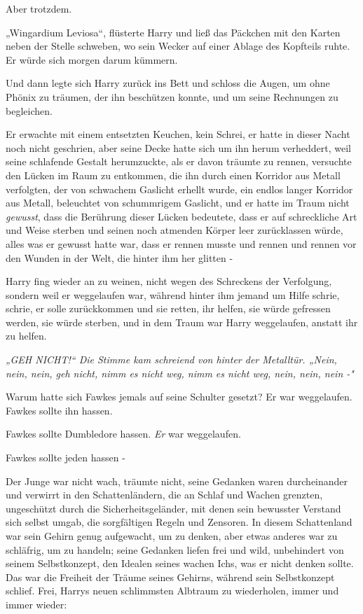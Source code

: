 {Aber trotzdem.

„Wingardium Leviosa“, flüsterte Harry und ließ das Päckchen mit den Karten neben der Stelle schweben, wo sein Wecker auf einer Ablage des Kopfteils ruhte. Er würde sich morgen darum kümmern.

Und dann legte sich Harry zurück ins Bett und schloss die Augen, um ohne Phönix zu träumen, der ihn beschützen konnte, und um seine Rechnungen zu begleichen.

Er erwachte mit einem entsetzten Keuchen, kein Schrei, er hatte in dieser Nacht noch nicht geschrien, aber seine Decke hatte sich um ihn herum verheddert, weil seine schlafende Gestalt herumzuckte, als er davon träumte zu rennen, versuchte den Lücken im Raum zu entkommen, die ihn durch einen Korridor aus Metall verfolgten, der von schwachem Gaslicht erhellt wurde, ein endlos langer Korridor aus Metall, beleuchtet von schummrigem Gaslicht, und er hatte im Traum nicht \emph{gewusst}, dass die Berührung dieser Lücken bedeutete, dass er auf schreckliche Art und Weise sterben und seinen noch atmenden Körper leer zurücklassen würde, alles was er gewusst hatte war, dass er rennen musste und rennen und rennen vor den Wunden in der Welt, die hinter ihm her glitten -

Harry fing wieder an zu weinen, nicht wegen des Schreckens der Verfolgung, sondern weil er weggelaufen war, während hinter ihm jemand um Hilfe schrie, schrie, er solle zurückkommen und sie retten, ihr helfen, sie würde gefressen werden, sie würde sterben, und in dem Traum war Harry weggelaufen, anstatt ihr zu helfen.

\emph{\emph{„GEH NICHT!“ Die Stimme kam schreiend von hinter der Metalltür. „Nein, nein, nein, geh nicht, nimm es nicht weg, nimm es nicht weg, nein, nein, nein} \emph{-"}}

Warum hatte sich Fawkes jemals auf seine Schulter gesetzt? Er war weggelaufen. Fawkes sollte ihn hassen.

Fawkes sollte Dumbledore hassen. \emph{Er} war weggelaufen.

Fawkes sollte jeden hassen -

Der Junge war nicht wach, träumte nicht, seine Gedanken waren durcheinander und verwirrt in den Schattenländern, die an Schlaf und Wachen grenzten, ungeschützt durch die Sicherheitsgeländer, mit denen sein bewusster Verstand sich selbst umgab, die sorgfältigen Regeln und Zensoren. In diesem Schattenland war sein Gehirn genug aufgewacht, um zu denken, aber etwas anderes war zu schläfrig, um zu handeln; seine Gedanken liefen frei und wild, unbehindert von seinem Selbstkonzept, den Idealen seines wachen Ichs, was er nicht denken sollte. Das war die Freiheit der Träume seines Gehirns, während sein Selbstkonzept schlief. Frei, Harrys neuen schlimmsten Albtraum zu wiederholen, immer und immer wieder:

}
